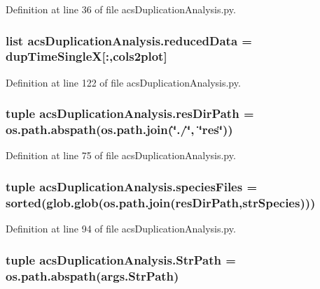 Definition at line 36 of file acs\-Duplication\-Analysis.\-py.

\hypertarget{a00094_a3b11d6e735ad53661a17cf0854cb9270}{
\subsubsection[{reduced\-Data}]{\setlength{\rightskip}{0pt plus 5cm}list acs\-Duplication\-Analysis.\-reduced\-Data = {\bf dup\-Time\-Single\-X}\mbox{[}\-:,{\bf cols2plot}\mbox{]}}}\label{a00094_a3b11d6e735ad53661a17cf0854cb9270}


Definition at line 122 of file acs\-Duplication\-Analysis.\-py.

\hypertarget{a00094_ace1b658a12d17a1359f37ebf927ea9b5}{
\subsubsection[{res\-Dir\-Path}]{\setlength{\rightskip}{0pt plus 5cm}tuple acs\-Duplication\-Analysis.\-res\-Dir\-Path = os.\-path.\-abspath(os.\-path.\-join(\char`\"{}./\char`\"{}, \char`\"{}res\char`\"{}))}}\label{a00094_ace1b658a12d17a1359f37ebf927ea9b5}


Definition at line 75 of file acs\-Duplication\-Analysis.\-py.

\hypertarget{a00094_ad70f67ea048141937d94adbeb21b8803}{
\subsubsection[{species\-Files}]{\setlength{\rightskip}{0pt plus 5cm}tuple acs\-Duplication\-Analysis.\-species\-Files = sorted(glob.\-glob(os.\-path.\-join({\bf res\-Dir\-Path},{\bf str\-Species})))}}\label{a00094_ad70f67ea048141937d94adbeb21b8803}


Definition at line 94 of file acs\-Duplication\-Analysis.\-py.

\hypertarget{a00094_aebcbc9d17a453b6b3fb1813a731ad091}{
\subsubsection[{Str\-Path}]{\setlength{\rightskip}{0pt plus 5cm}tuple acs\-Duplication\-Analysis.\-Str\-Path = os.\-path.\-abspath(args.\-Str\-Path)}}\label{a00094_aebcbc9d17a453b6b3fb1813a731ad091}


